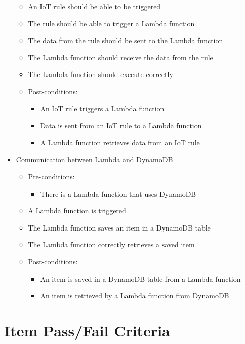 \documentclass{article}
\begin{document}
\begin{itemize}
\begin{itemize}
\begin{itemize}
			\end{itemize}
			\item An IoT rule should be able to be triggered
			\item The rule should be able to trigger a Lambda function
			\item The data from the rule should be sent to the Lambda function 
			\item The Lambda function should receive the data from the rule
			\item The Lambda function should execute correctly
			\item Post-conditions:
			\begin{itemize}
				\item An IoT rule triggers a Lambda function
				\item Data is sent from an IoT rule to a Lambda function
				\item A Lambda function retrieves data from an IoT rule
			\end{itemize}
		\end{itemize}
		
		\item{Communication between Lambda and DynamoDB}
		\begin{itemize}
			\item Pre-conditions: 
			\begin{itemize}
				\item There is a Lambda function that uses DynamoDB
			\end{itemize}
			\item A Lambda function is triggered
			\item The Lambda function saves an item in a DynamoDB table
			\item The Lambda function correctly retrieves a saved item
			\item Post-conditions:
			\begin{itemize}
				\item An item is saved in a DynamoDB table from a Lambda function
				\item An item is retrieved by a Lambda function from DynamoDB
			\end{itemize}
		\end{itemize}
	\end{itemize}

\section{Item Pass/Fail Criteria}
\end{document}
